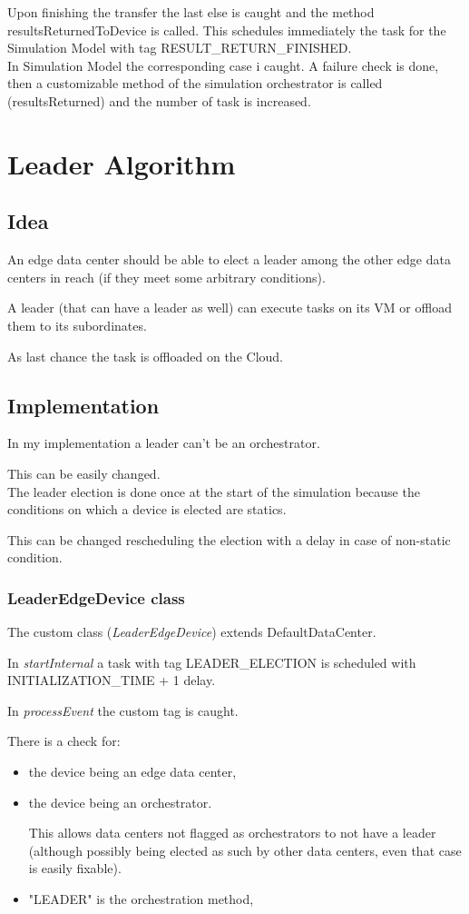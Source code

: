 \documentclass[12pt]{report}
\begin{document}
Upon finishing the transfer the last else is caught and the method \mbox{resultsReturnedToDevice} is called. This schedules immediately the task for the Simulation Model with tag RESULT\_RETURN\_FINISHED.
\\
In Simulation Model the corresponding case i caught. A failure check is done, then a customizable method of the simulation orchestrator is called (resultsReturned) and the number of task is increased.

\section{Leader Algorithm}
\label{leader algo}
\subsection*{Idea}
An edge data center should be able to elect a leader among the other edge data centers in reach (if they meet some arbitrary conditions).

A leader (that can have a leader as well) can execute tasks on its VM or offload them to its subordinates.

As last chance the task is offloaded on the Cloud.

\subsection*{Implementation}
In my implementation a leader can't be an orchestrator.

This can be easily changed.
\\
The leader election is done once at the start of the simulation because the conditions on which a device is elected are statics.

This can be changed rescheduling the election with a delay in case of non-static condition.

\subsubsection*{LeaderEdgeDevice class}
The custom class (\textit{LeaderEdgeDevice}) extends DefaultDataCenter.

In \textit{startInternal} a task with tag LEADER\_ELECTION is scheduled with INITIALIZATION\_TIME + 1 delay.

In \textit{processEvent} the custom tag is caught.

There is a check for:
 	\begin{itemize}
 		\item the device being an edge data center,
 		\item the device being an orchestrator.
 		
 		This allows data centers not flagged as orchestrators to not have a leader (although possibly being elected as such by other data centers, even that case is easily fixable).
 		\item "LEADER" is the orchestration method,
  	\end{itemize}
\end{document}

